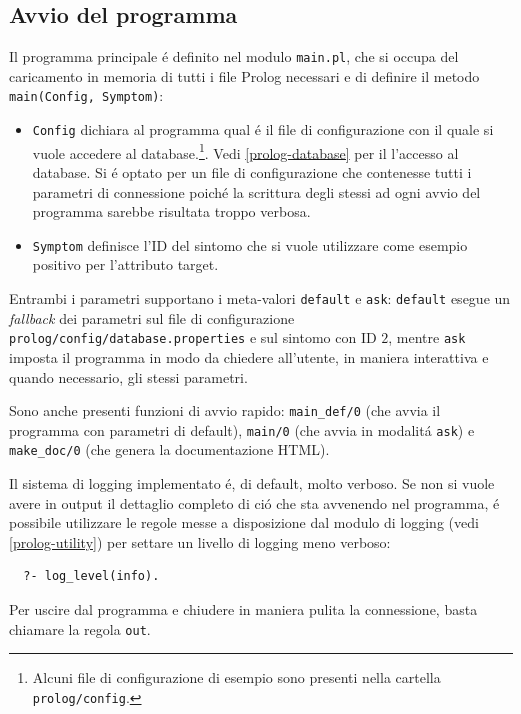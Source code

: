 \documentclass[preprint]{acm_proc_article-sp}
\begin{document}
\subsection{Avvio del programma}
\label{prolog-main}
Il programma principale \'e definito nel modulo \verb|main.pl|, che si occupa del caricamento in memoria di tutti i file Prolog necessari e di definire il metodo \verb|main(Config, Symptom)|:
\begin{itemize}
\item \verb|Config| dichiara al programma qual \'e il file di configurazione con il quale si vuole accedere al database.\footnote{Alcuni file di configurazione di esempio sono presenti nella cartella \texttt{prolog/config}.}. Vedi \ref{prolog-database} per il l'accesso al database. Si \'e optato per un file di configurazione che contenesse tutti i parametri di connessione poich\'e la scrittura degli stessi ad ogni avvio del programma sarebbe risultata troppo verbosa.
\item \verb|Symptom| definisce l'ID del sintomo che si vuole utilizzare come esempio positivo per l'attributo target.
\end{itemize}


Entrambi i parametri supportano i meta-valori \verb|default| e \verb|ask|: \verb|default| esegue un \textit{fallback} dei parametri sul file di configurazione \texttt{prolog/config/database.properties} e sul sintomo con ID $2$, mentre \verb|ask| imposta il programma in modo da chiedere all'utente, in maniera interattiva e quando necessario, gli stessi parametri.

Sono anche presenti funzioni di avvio rapido: \verb|main_def/0| (che avvia il programma con parametri di default), \verb|main/0| (che avvia in modalit\'a \verb|ask|) e \verb|make_doc/0| (che genera la documentazione HTML).

Il sistema di logging implementato \'e, di default, molto verboso. Se non si vuole avere in output il dettaglio completo di ci\'o che sta avvenendo nel programma, \'e possibile utilizzare le regole messe a disposizione dal modulo di logging (vedi \ref{prolog-utility}) per settare un livello di logging meno verboso:
\begin{verbatim}
  ?- log_level(info).
\end{verbatim}

Per uscire dal programma e chiudere in maniera pulita la connessione, basta chiamare la regola \verb|out|.
\end{document}
